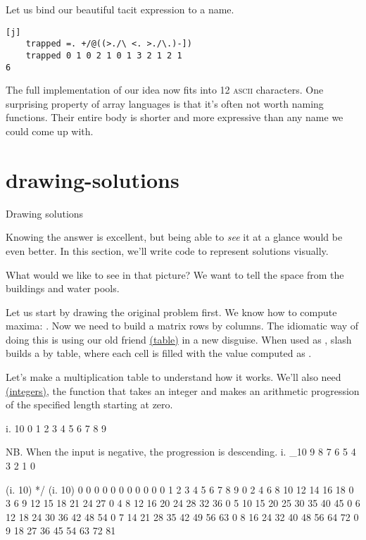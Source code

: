 \documentclass{article}
\begin{document}
Let us bind our beautiful tacit expression to a name.

\begin{verbatim}[j]
    trapped =. +/@((>./\ <. >./\.)-])
    trapped 0 1 0 2 1 0 1 3 2 1 2 1
6
\end{verbatim}

The full implementation of our idea now fits into 12 \textsc{ascii} characters.
One surprising property of array languages is that it's often not worth naming functions.
Their entire body is shorter and more expressive than any name we could come up with.

\section{drawing-solutions}{Drawing solutions}

Knowing the answer is excellent, but being able to \emph{see} it at a glance would be even better.
In this section, we'll write code to represent solutions visually.

What would we like to see in that picture?
We want to tell the space from the buildings and water pools.

Let us start by drawing the original problem first.
We know how to compute maxima: .
Now we need to build a matrix  rows by  columns.
The idiomatic way of doing this is using our old friend \href{https://code.jsoftware.com/wiki/Vocabulary/slash#dyadic}{\code{/} (table)} in a new disguise.
When used as , slash builds a  by  table, where each cell  is filled with the value computed as .

Let's make a multiplication table to understand how it works.
We'll also need \href{https://code.jsoftware.com/wiki/Vocabulary/idot}{ (integers)}, the function that takes an integer and makes an arithmetic progression of the specified length starting at zero.

\begin{code}[j]
    i. 10
0 1 2 3 4 5 6 7 8 9

    NB. When the input is negative, the progression is descending.
    i. _10
9 8 7 6 5 4 3 2 1 0

    (i. 10) */ (i. 10)
0 0  0  0  0  0  0  0  0  0
0 1  2  3  4  5  6  7  8  9
0 2  4  6  8 10 12 14 16 18
0 3  6  9 12 15 18 21 24 27
0 4  8 12 16 20 24 28 32 36
0 5 10 15 20 25 30 35 40 45
0 6 12 18 24 30 36 42 48 54
0 7 14 21 28 35 42 49 56 63
0 8 16 24 32 40 48 56 64 72
0 9 18 27 36 45 54 63 72 81
\end{code}
\end{document}
